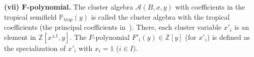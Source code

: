 {\bf (vii) $\boldsymbol{F}$-polynomial.}
The cluster algebra $\mathcal{A}(B,x,y)$ with coef\/f\/icients in
the tropical semi\-f\/ield $\mathbb{P}_{\mathrm{trop}}(y)$ is called the
cluster algebra with the tropical coef\/f\/icients
(the principal coef\/f\/icients in~\cite{Fomin07}).
There, each cluster variable $x'_i$ is an element
in $\mathbb{Z}[x^{\pm 1},y]$.
The $F$-polynomial $F'_i(y)\in \mathbb{Z}[y]$ (for $x'_i$)
is def\/ined as the specialization of $x'_i$ with $x_i=1$ ($i\in I$).

